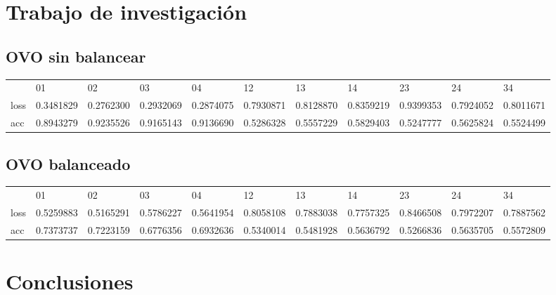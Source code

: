 \documentclass[]{article}
\begin{document}
\section{Trabajo de investigación}

	\subsection{OVO sin balancear}
	
	\begin{table}[h]
		\begin{tabular}{lllllllllll}
			& 01 & 02 & 03 & 04 & 12 & 13 & 14 & 23 & 24 & 34 \\
			loss & 0.3481829 & 0.2762300 & 0.2932069 & 0.2874075 & 0.7930871 & 0.8128870 & 0.8359219 & 0.9399353 & 0.7924052 & 0.8011671 \\
			acc & 0.8943279 & 0.9235526 & 0.9165143 & 0.9136690 & 0.5286328 & 0.5557229 & 0.5829403 & 0.5247777 & 0.5625824 & 0.5524499
		\end{tabular}
	\end{table}
	
	\subsection{OVO balanceado}
	
	\begin{table}[h]
		\begin{tabular}{lllllllllll}
			& 01 & 02 & 03 & 04 & 12 & 13 & 14 & 23 & 24 & 34 \\
			loss & 0.5259883 & 0.5165291 & 0.5786227 & 0.5641954 & 0.8058108 & 0.7883038 & 0.7757325 & 0.8466508 & 0.7972207 & 0.7887562 \\
			acc & 0.7373737 & 0.7223159 & 0.6776356 & 0.6932636 & 0.5340014 & 0.5481928 & 0.5636792 & 0.5266836 & 0.5635705 & 0.5572809
		\end{tabular}
	\end{table}

\section{Conclusiones}



\end{document}
